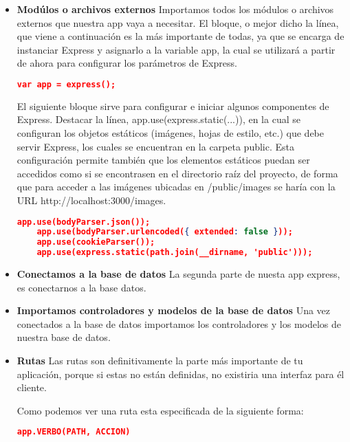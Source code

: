 \begin{itemize}

    \item \textbf{Modúlos o archivos externos} Importamos todos los módulos o archivos externos que nuestra app vaya a necesitar. El bloque, o mejor dicho la línea, que viene a continuación es la más importante de todas, ya que se encarga de instanciar Express y asignarlo a la variable app, la cual se utilizará a partir de ahora para configurar los parámetros de Express.
    
    \begin{lstlisting}[language=JSON] 
    var app = express();
   \end{lstlisting}
   
   El siguiente bloque sirve para configurar e iniciar algunos componentes de Express. Destacar la línea, app.use(express.static(...)), en la cual se configuran los objetos estáticos (imágenes, hojas de estilo, etc.) que debe servir Express, los cuales se encuentran en la carpeta public. Esta configuración permite también que los elementos estáticos puedan ser accedidos como si se encontrasen en el directorio raíz del proyecto, de forma que para acceder a las imágenes ubicadas en /public/images se haría con la URL http://localhost:3000/images.
    \begin{lstlisting}[language=JSON] 
    app.use(bodyParser.json());
    app.use(bodyParser.urlencoded({ extended: false }));
    app.use(cookieParser());
    app.use(express.static(path.join(__dirname, 'public')));
   \end{lstlisting}
   
    
    \item \textbf{Conectamos a la base de datos} La segunda parte de nuesta app express, es conectarnos a la base datos. 
    
    \item \textbf{Importamos controladores y modelos de la base de datos} Una vez conectados a la base de datos importamos los controladores y los modelos de nuestra base de datos.
    
    
   \item \textbf{Rutas} Las rutas son definitivamente la parte más importante de tu aplicación, porque si estas no están definidas, no existiria una interfaz para él cliente.
   
   Como podemos ver una ruta esta especificada de la siguiente forma:
   \begin{lstlisting}[language=JSON] 
    app.VERBO(PATH, ACCION)
   \end{lstlisting}
   

\end{itemize}
